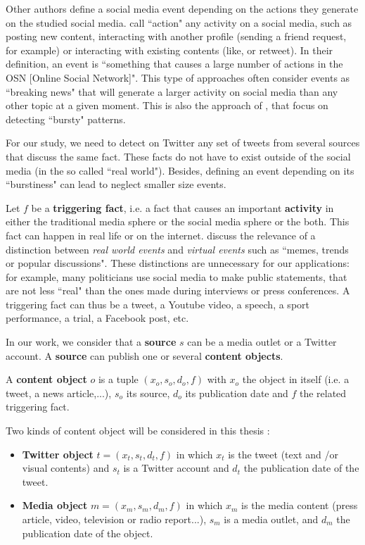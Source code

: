 Other authors define a social media event depending on the actions they generate on the studied social media. \citet{panagiotou_detecting_2016} call ``action" any activity on a social media, such as posting new content, interacting with another profile (sending a friend request, for example) or interacting with existing contents (like, or retweet). In their definition, an event is ``something that causes a large number of actions in the OSN [Online Social Network]". This type of approaches often consider events as ``breaking news" that will generate a larger activity on social media than any other topic at a given moment. This is also the approach of \citet{guille_event_2015}, that focus on detecting ``bursty" patterns.

For our study, we need to detect on Twitter any set of tweets from several sources that discuss the same fact. These facts do not have to exist outside of the social media (in the so called ``real world"). Besides, defining an event depending on its ``burstiness" can lead to neglect smaller size events.

Let $f$ be a \textbf{triggering fact}, i.e. a fact that causes an
important \textbf{activity} in either the traditional media sphere or the social media sphere or the both. This fact can happen in real life or on the internet. \citet{panagiotou_detecting_2016} discuss the relevance of a distinction between \textit{real world events} and \textit{virtual events} such as ``memes, trends or popular discussions". These distinctions are unnecessary for our applications: for example, many politicians use social media to make public statements, that are not less ``real" than the ones made during interviews or press conferences. A triggering fact can thus be a tweet, a Youtube video, a speech, a sport performance, a trial, a Facebook post, etc.


In our work, we consider that a \textbf{source} $s$ can be a media outlet or a Twitter account. A \textbf{source} can publish one or several \textbf{content objects}.


A \textbf{content object} $o$ is a tuple $(x_o, s_o, d_o, f)$ with $x_o$ the object in itself (i.e. a  tweet, a news article,...), $s_o$ its source,
$d_o$ its publication date and $f$ the related triggering fact.

Two kinds of content object will be considered in this thesis :
\begin{itemize}
\item \textbf{Twitter object} $t =(x_t, s_t,d_t, f ) $ in which $x_t$ is the tweet
(text and /or visual contents) and $s_t$ is a Twitter account and $d_t$
the publication date of the tweet.
\item \textbf{Media object}  $m=(x_m,s_m,d_m,f)$ in which $x_m$ is the media content (press article, video, television or radio report...), $s_m$ is a media outlet, and $d_m$ the publication date of the object.
\end{itemize}
  
